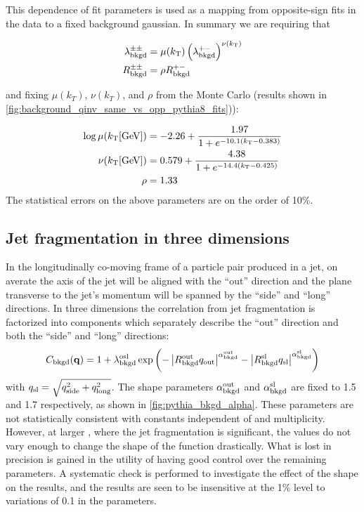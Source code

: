 This \kt dependence of fit parameters is used as a mapping from opposite-sign fits in the data to a fixed background gaussian.
In summary we are requiring that

\begin{align}
\lambda_{\mathrm{bkgd}}^{\pm\pm} &= \mu(k_\mathrm{T}) \left(\lambda_{\mathrm{bkgd}}^{+-}\right)^{\nu(k_\mathrm{T})} \label{eq:lambdaBackPar}\\
R_{\mathrm{bkgd}}^{\pm\pm} &= \rho R_{\mathrm{bkgd}}^{+-} \label{eq:rBackPar}
\end{align}

and fixing $\mu(k_T)$, $\nu(k_T)$, and $\rho$ from the Monte Carlo (results shown in \cref{fig:background_qinv_same_vs_opp_pythia8_fits})):

\begin{align}
\log \mu (\kt [\textrm{GeV}]) &= -2.26 + \frac{1.97}{1 + e^{-10.1 (\kt - 0.383)}} \label{eq:mu}\\
\nu(\kt [\textrm{GeV}]) &= 0.579 + \frac{4.38}{1 + e^{-14.4 (\kt - 0.425)}} \label{eq:nu}\\
\rho &= 1.33 \label{eq:rho} %
\end{align}
The statistical errors on the above parameters are on the order of 10\%.


\subsection{Jet fragmentation in three dimensions}
\label{subsec:jet_frag_3d}

In the longitudinally co-moving frame of a particle pair produced in a jet, on averate the axis of the jet will be aligned with the ``out'' direction and the plane transverse to the jet's momentum will be spanned by the ``side'' and ``long'' directions. In three dimensions the correlation from jet fragmentation is factorized into components which separately describe the ``out'' direction and both the ``side'' and ``long'' directions:
\begin{equation}
C_{\mathrm{bkgd}}(\mathbf{q}) = 1 + \lambda_{\mathrm{bkgd}}^\mathrm{osl} \exp\left(-\left| R_\mathrm{bkgd}^\mathrm{out} q_{\mathrm{out}} \right|^{\alpha_{\mathrm{bkgd}}^\mathrm{out}} - \left| R_\mathrm{bkgd}^\mathrm{sl} q_{\mathrm{sl}} \right|^{\alpha_{\mathrm{bkgd}}^\mathrm{sl}}\right) \label{eq:jet_frag_form_3d}
\end{equation}
with $q_{\mathrm{sl}} = \sqrt{q_{\mathrm{side}}^2 + q_{\mathrm{long}}^2}$.
The shape parameters $\alpha_{\mathrm{bkgd}}^\mathrm{out}$ and $\alpha_{\mathrm{bkgd}}^\mathrm{sl}$ are fixed to 1.5 and 1.7 respectively, as shown in \cref{fig:pythia_bkgd_alpha}.
These parameters are not statistically consistent with constants independent of \kt and multiplicity.
However, at larger \kt, where the jet fragmentation is significant, the values do not vary enough to change the shape of the function drastically.
What is lost in precision is gained in the utility of having good control over the remaining parameters.
A systematic check is performed to investigate the effect of the shape on the results, and the results are seen to be insensitive at the 1\% level to variations of 0.1 in the \abkgd parameters.

